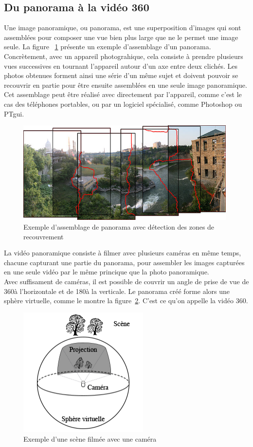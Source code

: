 \subsection{Du panorama à la vidéo 360}
Une image panoramique, ou panorama, est une superposition d'images qui sont assemblées
pour composer une vue bien plus large que ne le permet une image seule. La figure~ 
\ref{RochesterNY} présente un exemple d'assemblage d'un panorama.\\
Concrètement, avec un appareil photograhique, cela consiste à prendre plusieurs vues
successives en tournant l'appareil autour d'un axe entre deux clichés. 
Les photos obtenues forment ainsi une série d'un même sujet et doivent pouvoir 
se recouvrir en partie pour être ensuite assemblées en une seule image panoramique. 
Cet assemblage peut être réalisé avec directement par l'appareil, comme c'est le cas des 
téléphones portables, ou par un logiciel spécialisé, comme Photoshop\cite{photomerge} 
ou PTgui\cite{PTgui}.
\begin{figure}
  \centering
  \includegraphics[width=11cm]{images/RochesterNY.jpg}
  \caption{Exemple d'assemblage de panorama avec détection des zones de recouvrement\cite{RochesterNY}}
  \label{RochesterNY}
\end{figure}
\newline
La vidéo panoramique consiste à filmer avec plusieurs caméras en même temps, chacune
capturant une partie du panorama, pour assembler les images capturées en une seule
vidéo par le même princique que la photo panoramique.\\
Avec suffisament de caméras, il est possible de couvrir un angle de prise de vue 
de 360\degree à l'horizontale et de 180\degree à la verticale. Le panorama créé
forme alors une sphère virtuelle, comme le montre la figure~\ref{rig-sphere}. 
C'est ce qu'on appelle la vidéo 360.
\begin{figure}
  \centering
  \includegraphics[width=6.5cm]{images/camera-projection.png}
  \caption{Exemple d'une scène filmée avec une caméra}
  \label{rig-sphere}
\end{figure}
